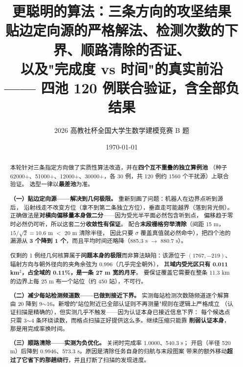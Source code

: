 

\title{\heiti 更聪明的算法：三条方向的攻坚结果\\[4pt]
       \large 贴边定向源的严格解法、检测次数的下界、顺路清除的否证、\\
       以及"完成度 vs 时间"的真实前沿\\[2pt]
       \normalsize —— 四池 120 例联合验证，含全部负结果}
\author{2026 高教社杯全国大学生数学建模竞赛 B 题}
\date{\today}


\maketitle
\thispagestyle{fancy}

\begin{abstract}
\noindent
本轮针对三条指定方向做了实质性算法改造，并在\textbf{四个互不重叠的独立算例池}
（种子 62000+、51000+、12000+、30000+，各 30 例，共 120 例约 1560 个干扰源）上联合验证。
选型一律以\textbf{最差池}为准。

\textbf{（一）贴边定向源——解决到几何极限。} 重新刻画了问题：机器人在边界点听到源后，
沿射线走不改变方位（拿不到第二条独立方位），垂直走可能越界（落到背光侧）。
正确做法是\textbf{对横向偏移量本身做二分}——因为受光半平面必然包含听到点，
偏移趋于零时必然仍可听，所以这套二分\textbf{收敛性有保证}。
配合\textbf{末段栅格穷举清除}（间距 15 m，$15/\sqrt2=10.6$ m $<$ 20 m 清除半径，
因此只要 $\sigma$ 覆盖真值就必然命中），把四个池的漏源从
\textbf{3 个降到 1 个}，而且平均时间还略降（885.3 s $\to$ 880.7 s）。

仅剩的 1 例经几何核算属于\textbf{问题本身的极限}而非算法缺陷：该源位于 $(1767,-219)$、
辐射方向与朝外径向的夹角余弦为 0.996（几乎完全朝外），
其\textbf{域内受光区只有 0.011 km$^2$，占全域的 0.11\%，是一条 27 m 宽的月牙}。
要保证覆盖它需要在整条 11.3 km 的边界上每 25 m 布一个站位（约 450 站），不可行。

\textbf{（二）减少每站检测频道数——已做到接近下界。} 实测每站检测次数随频道逐个解算
由 20 降到 9$\sim$16。新增的"站位附近已全部认证则不再测量"规则在逻辑上严格成立
（认证扫描是精确的），但实测几乎不触发——因为认证本身已接近信息下界：
每个候选点只需 3$\sim$4 条环绕读数，而格点扫描正好提供这么多。继续压缩只能靠
\textbf{削弱认证本身}，那是用完成率换时间。

\textbf{（三）顺路清除——实测为负优化。} 关闭时完成率 1.0000、540.3 s；
开启（半径 520 m）后降到 0.9946、573.3 s。原因是清除任务自身的归航与末段图案
带来的额外移动\textbf{超过了它省下的那趟绕行}，并且打断了扫描的发现进度。


\end{abstract}
